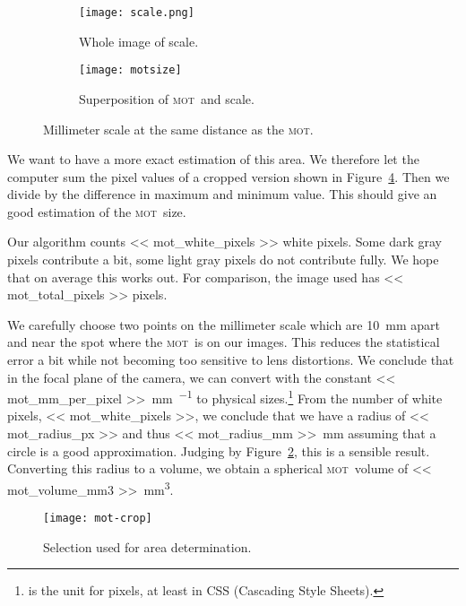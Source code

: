 \documentclass[11pt, english, fleqn, DIV=15, headinclude, BCOR=2cm]{scrreprt}
\newcommand\mot{\textsc{mot}}
\begin{document}
\begin{figure}
    \begin{subfigure}{.45\textwidth}
        \centering
        \texttt{[image: scale.png]}
        \caption{Whole image of scale.}
        \label{fig:scale}
    \end{subfigure}
    \hfill
    \begin{subfigure}{.45\textwidth}
        \centering
        \texttt{[image: motsize]}
        \caption{Superposition of \mot\ and scale.}
        \label{fig:motsize}
    \end{subfigure}
    \caption{Millimeter scale at the same distance as the \mot.}
    \label{fig:mot_size}
\end{figure}

We want to have a more exact estimation of this area. We therefore let the
computer sum the pixel values of a cropped version shown in
Figure~\ref{fig:mot-crop}. Then we divide by the difference in maximum and
minimum value. This should give an good estimation of the \mot\ size.

Our algorithm counts \num{<< mot_white_pixels >>} white pixels. Some dark gray
pixels contribute a bit, some light gray pixels do not contribute fully. We
hope that on average this works out. For comparison, the image used has \num{<<
mot_total_pixels >>} pixels.

We carefully choose two points on the millimeter scale which are
\SI{10}{\milli\meter} apart and near the spot where the \mot\ is on our images.
This reduces the statistical error a bit while not becoming too sensitive to
lens distortions. We conclude that in the focal plane of the camera, we can
convert with the constant \SI{<< mot_mm_per_pixel >>}{\milli\meter\per\pixel}
to physical sizes.\footnote{\si{\pixel} is the unit for pixels, at least in CSS
(Cascading Style Sheets).} From the number of white pixels, \num{<<
mot_white_pixels >>}, we conclude that we have a radius of \SI{<< mot_radius_px
>>}{\pixel} and thus \SI{<< mot_radius_mm >>}{\milli\meter} assuming that a
circle is a good approximation. Judging by Figure~\ref{fig:motsize}, this is a
sensible result. Converting this radius to a volume, we obtain a spherical
\mot\ volume of \SI{<< mot_volume_mm3 >>}{\milli\meter\cubed}.

\begin{figure}
    \centering
    \texttt{[image: mot-crop]}
    \caption{%
        Selection used for area determination.
    }
    \label{fig:mot-crop}
\end{figure}
\end{document}
